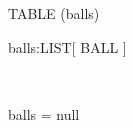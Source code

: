 \begin{class}{TABLE}
\zproject(balls)\\
\begin{state}
balls:\downarrow LIST[ BALL ]
\end{state}\\

\begin{init}
balls = null
\end{init}\\
\end{class}
